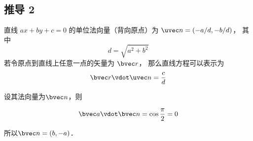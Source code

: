 \subsection{推导 2}


直线 $ax + by + c = 0$ 的单位法向量（背向原点）为 $\uvec n = (-a/d, -b/d)$， 其中
\begin{equation}
d = \sqrt{a^2 + b^2}
\end{equation}
若令原点到直线上任意一点的矢量为 $\bvec r$， 那么直线方程可以表示为
\begin{equation}
\bvec r \vdot \uvec n = \frac{c}{d}
\end{equation}


 设其法向量为$\bvec n$，则

\begin{equation}
\bvec a \vdot \bvec n = \cos \frac{\pi}{2} = 0
\end{equation}

所以$\bvec n=(b,-a)$．




